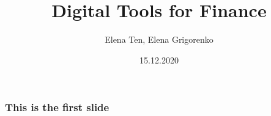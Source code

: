 \documentclass {beamer}
\title{Digital Tools for Finance}
\author{Elena Ten, Elena Grigorenko}
\institute{University of Zurich}
\date {15.12.2020}
\begin{document}
\frame{\titlepage}

\begin{frame}
\frametitle{This is the first slide}

\end{frame}
\end{document}

